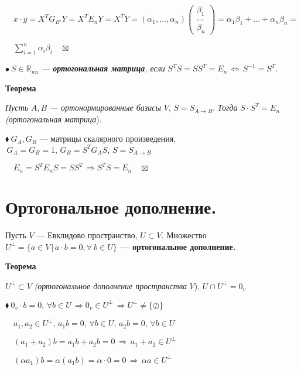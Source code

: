 \documentclass[a4paper, 12pt]{report}
\begin{document}
	$\quad x \cdot y=X^T G_{B'} Y= X^T E_n Y=X^T Y=(\alpha_1,...,\alpha_n) \begin{pmatrix}
		\beta_1\\
		...\\
		\beta_n
	\end{pmatrix}= \alpha_1 \beta_1+...+\alpha_n \beta_n=$
	
	$\quad\sum_{i=1}^n \alpha_i \beta_i \quad \boxtimes$
	\par \bigskip
	$\bullet\ S \in \mathbb{R}_{nn}$\textit{ --- \textbf{ортогональная матрица}, если }$S^T S= S S^T=E_n \, \Longleftrightarrow \, S^{-1}=S^T$.
	
	\par \bigskip
	\textbf{Теорема}
	
	\textit{Пусть }$A,B$\textit{ --- ортонормированные базисы }$V$, $S=S_{A \rightarrow B}$. \textit{Тогда} $S \cdot S^T=E_n$\textit{ (ортогональная матрица}).
	\par \bigskip
	$\blacklozenge\ G_A, G_B$ --- матрицы скалярного произведения, $\, G_A=G_B=1, \, G_B=S^T G_A S, \, S=S_{A \rightarrow B}$
	
	$\quad E_n=S^T E_n S=S S^T \, \Rightarrow S^T S=E_n \quad \boxtimes$
	
	
	
	
	
	
	
	
	
	
	\section{Ортогональное дополнение.}
	\quad\;Пусть $V$ --- Евклидово пространство, $U \subset V$. Множество $U^{\perp}=\{a \in V \, | \, a \cdot b = 0, \forall\ b \in U\}$\textbf{ --- ортогональное дополнение. }
	\par \bigskip
	\textbf{Теорема}
	
	$U^{\perp} \subset V$\textit{ (ортогональное дополнение пространства} $V$), $U \cap U^{\perp}={0_v}$
	\par \bigskip
	$\blacklozenge\ 0_v \cdot b=0, \, \forall b \in U \, \Rightarrow 0_v \in U^{\perp} \, \Rightarrow U^{\perp} \ne \{\oslash\}$
	
	$\quad a_1,a_2 \in U^{\perp}, \, a_1 b=0, \, \forall b \in U, \, a_2 b=0, \, \forall b \in U$
	
	$\quad(a_1+a_2)b=a_1b+a_2b=0 \, \Rightarrow \, a_1+a_2 \in U^{\perp}$
	
	$\quad (\alpha a_1)b=\alpha(a_1 b)=\alpha\cdot 0=0 \, \Rightarrow \, \alpha a \in U^{\perp}$
	
\end{document}
